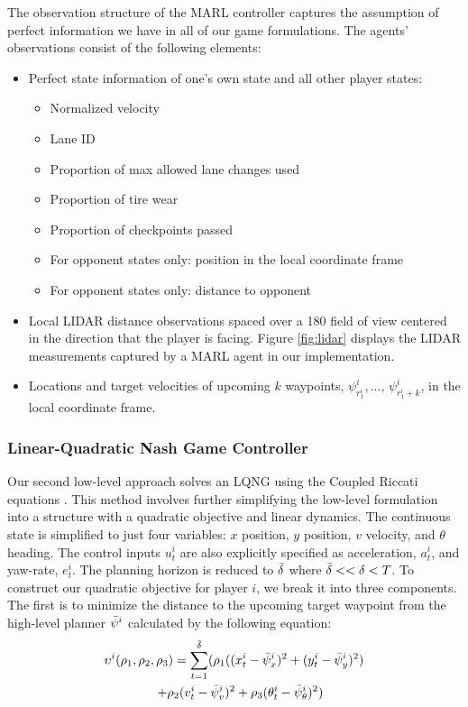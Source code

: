 The observation structure of the MARL controller captures the assumption of perfect information we have in all of our game formulations. The agents' observations consist of the following elements:
\begin{itemize}
    \item Perfect state information of one's own state and all other player states:
    \begin{itemize}
        \item Normalized velocity
        \item Lane ID
        \item Proportion of max allowed lane changes used
        \item Proportion of tire wear
        \item Proportion of checkpoints passed
        \item For opponent states only: position in the local coordinate frame
        \item For opponent states only: distance to opponent
    \end{itemize}
    \item Local LIDAR distance observations spaced over a 180\textdegree{} field of view centered in the direction that the player is facing. Figure \ref{fig:lidar} displays the LIDAR measurements captured by a MARL agent in our implementation.
    \item Locations and target velocities of upcoming $k$ waypoints, $\psi^i_{r^i_{1}}, ..., \, \psi^i_{r^i_{1} + k}$, in the local coordinate frame. 
\end{itemize}

\subsubsection{Linear-Quadratic Nash Game Controller}
Our second low-level approach solves an LQNG using the Coupled Riccati equations \cite{basar}. This method involves further simplifying the low-level formulation into a structure with a quadratic objective and linear dynamics. The continuous state is simplified to just four variables: $x$ position, $y$ position, $v$ velocity, and $\theta$ heading. The control inputs $u^i_t$ are also explicitly specified as acceleration, $a^i_t$, and yaw-rate, $e^i_t$. The planning horizon is reduced to $\Bar{\delta}$ where $\Bar{\delta} << \delta < T$. To construct our quadratic objective for player $i$, we break it into three components. The first is to minimize the distance to the upcoming target waypoint from the high-level planner $\Bar{\psi}^i$ calculated by the following equation:
\begin{multline} \label{eq:lqng_obj1}
\upsilon^i(\rho_1, \rho_2,\rho_3) =  \sum_{t = 1}^{\Bar{\delta}} (\rho_1((x^i_{t} - \Bar{\psi}^i_x)^2 + (y^i_{t} - \Bar{\psi}^i_y)^2) \\   \quad + \rho_2 (v^i_{t} - \Bar{\psi}^i_v)^2 
 + \rho_3 (\theta^i_{t} - \Bar{\psi}^i_\theta)^2)
\end{multline}

